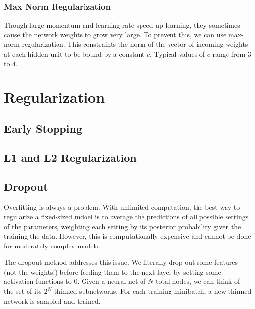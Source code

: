 \documentclass{article}
\theoremstyle{definition}
\theoremstyle{remark}
\theoremstyle{definition}
\begin{document}
\subsubsection{Max Norm Regularization}

Though large momentum and learning rate speed up learning, they sometimes cause the network weights to grow very large. To prevent this, we can use max-norm regularization. This constraints the norm of the vector of incoming weights at each hidden unit to be bound by a constant $c$. Typical values of $c$ range from $3$ to $4$. 


\section{Regularization}

\subsection{Early Stopping}

\subsection{L1 and L2 Regularization}

\subsection{Dropout}

Overfitting is always a problem. With unlimited computation, the best way to regularize a fixed-sized mdoel is to average the predictions of all possible settings of the parameters, weighting each setting by its posterior probability given the training the data. However, this is computationally expensive and cannot be done for moderately complex models. 

The dropout method addresses this issue. We literally drop out some features (not the weights!) before feeding them to the next layer by setting some activation functions to $0$. Given a neural net of $N$ total nodes, we can think of the set of its $2^N$ thinned subnetworks. For each training minibatch, a new thinned network is sampled and trained. 
\end{document}
